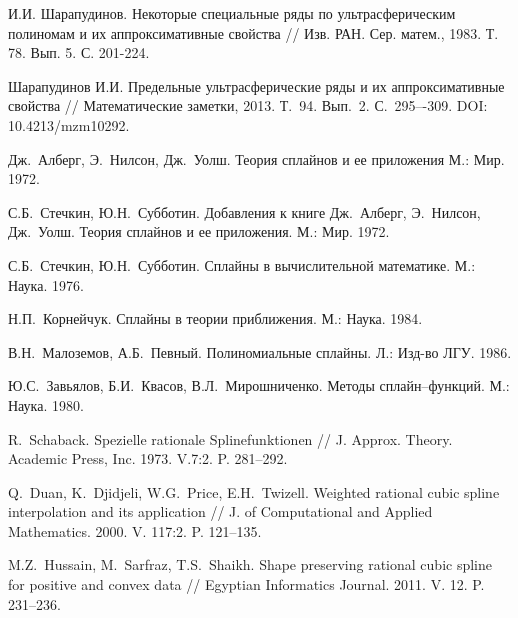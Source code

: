 \begin{thebibliography}{999}

 И.И. Шарапудинов. Некоторые специальные ряды по ультрасферическим полиномам и их аппроксимативные свойства // Изв. РАН. Сер. матем., 1983. Т. 78. Вып. 5. С. 201-224.



 Шарапудинов И.И. Предельные ультрасферические ряды и их аппроксимативные свойства // Математические заметки, 2013. Т.~94. Вып.~2. С.~295–-309. DOI: 10.4213/mzm10292.


  Дж.~Алберг, Э.~Нилсон, Дж.~Уолш. Теория сплайнов и ее приложения  М.: Мир. 1972.




  С.Б.~Стечкин, Ю.Н.~Субботин. Добавления к книге Дж.~Алберг, Э.~Нилсон, Дж.~Уолш.
 Теория сплайнов и ее приложения.  М.: Мир. 1972.




 С.Б.~Стечкин, Ю.Н.~Субботин.  Сплайны в вычислительной математике. М.:  Наука. 1976.




  Н.П.~Корнейчук.  Сплайны в теории приближения. М.:  Наука. 1984.





  В.Н.~Малоземов, А.Б.~Певный. Полиномиальные сплайны. Л.: Изд-во ЛГУ. 1986.




 Ю.С.~Завьялов, Б.И.~Квасов, В.Л.~Мирошниченко.  Методы сплайн--функций.  М.: Наука. 1980.





 R.~Schaback.  Spezielle rationale Splinefunktionen //  J. Approx. Theory. Academic Press, Inc. 1973. V.7:2.
P. 281--292.




  Q.~Duan, K.~Djidjeli, W.G.~Price, E.H.~Twizell.  Weighted rational  cubic spline interpolation
 and its application // J. of Computational  and Applied Mathematics. 2000. V. 117:2. P. 121--135.




  M.Z.~Hussain, M.~Sarfraz, T.S.~Shaikh.  Shape preserving rational cubic spline for positive
and convex data //  Egyptian Informatics Journal. 2011. V.  12. P. 231--236.




\end{thebibliography}
